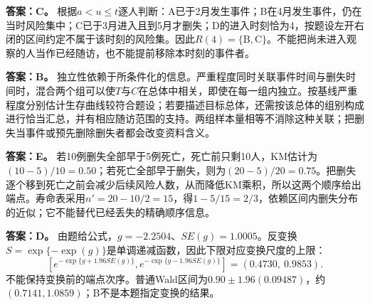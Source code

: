 \textbf{答案：C。} 根据$a<u\le t$逐人判断：A已于2月发生事件；B在4月发生事件，仍在当时风险集中；C已于3月进入且到5月才删失；D的进入时刻恰为4，按题设左开右闭的区间约定不属于该时刻的风险集。因此$R(4)=\{\mathrm B,\mathrm C\}$。不能把尚未进入观察的人当作已经随访，也不能提前移除本时刻的事件者。
\par\nobreak\smallskip{}

\textbf{答案：B。} 独立性依赖于所条件化的信息。严重程度同时关联事件时间与删失时间时，混合两个组可以使$T$与$C$在总体中相关，即使在每一组内独立。按基线严重程度分别估计生存曲线较符合题设；若要描述目标总体，还需按该总体的组别构成进行恰当汇总，并有相应随访范围的支持。两组样本量相等不消除这种关联；把删失当事件或预先删除删失者都会改变资料含义。
\par\nobreak\smallskip{}

\textbf{答案：E。} 若10例删失全部早于5例死亡，死亡前只剩10人，KM估计为$(10-5)/10=0.50$；若死亡全部早于删失，则为$(20-5)/20=0.75$。把删失逐个移到死亡之前会减少后续风险人数，从而降低KM乘积，所以这两个顺序给出端点。寿命表采用$n'=20-10/2=15$，得$1-5/15=2/3$，依赖区间内删失分布的近似；它不能替代已经丢失的精确顺序信息。
\par\nobreak\smallskip{}

\textbf{答案：D。} 由题给公式，$g=-2.2504$、$SE(g)=1.0005$。反变换$S=\exp\{-\exp(g)\}$是单调递减函数，因此下限对应变换尺度的上限：
\[
\left[
e^{-\exp\{g+1.96SE(g)\}},
e^{-\exp\{g-1.96SE(g)\}}
\right]
=(0.4730,\ 0.9853).
\]
不能保持变换前的端点次序。普通Wald区间为$0.90\pm1.96(0.09487)$，约$(0.7141,1.0859)$；B不是本题指定变换的结果。
\par\nobreak\smallskip{}

